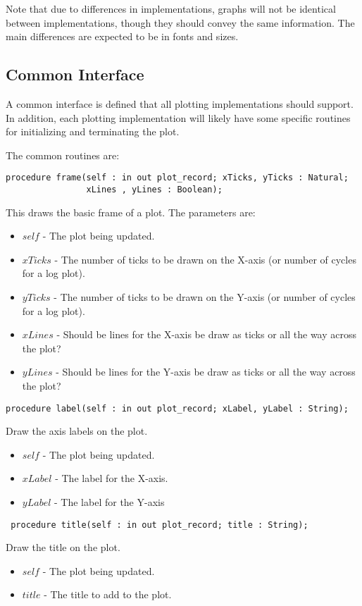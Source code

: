\documentclass[10pt, openany]{book}
\begin{document}
Note that due to differences in implementations, graphs will not be identical between implementations, though they should convey the same information.  The main differences are expected to be in fonts and sizes.

\subsection{Common Interface}
A common interface is defined that all plotting implementations should support.  In addition, each plotting implementation will likely have some specific routines for initializing and terminating the plot.

The common routines are:
\begin{lstlisting}
procedure frame(self : in out plot_record; xTicks, yTicks : Natural;
                xLines , yLines : Boolean);
\end{lstlisting}
This draws the basic frame of a plot.  The parameters are:
\begin{itemize}
  \item $self$ - The plot being updated.
  \item $xTicks$ - The number of ticks to be drawn on the X-axis (or number of cycles for a log plot).
  \item $yTicks$ - The number of ticks to be drawn on the Y-axis (or number of cycles for a log plot).
  \item $xLines$ - Should be lines for the X-axis be draw as ticks or all the way across the plot?
  \item $yLines$ - Should be lines for the Y-axis be draw as ticks or all the way across the plot?
\end{itemize}
\begin{lstlisting}
procedure label(self : in out plot_record; xLabel, yLabel : String);
\end{lstlisting}
Draw the axis labels on the plot.
\begin{itemize}
  \item $self$ - The plot being updated.
  \item $xLabel$ - The label for the X-axis.
  \item $yLabel$ - The label for the Y-axis
\end{itemize}
\begin{lstlisting}
 procedure title(self : in out plot_record; title : String);
\end{lstlisting}
Draw the title on the plot.
\begin{itemize}
  \item $self$ - The plot being updated.
  \item $title$ - The title to add to the plot.
\end{itemize}
\end{document}
